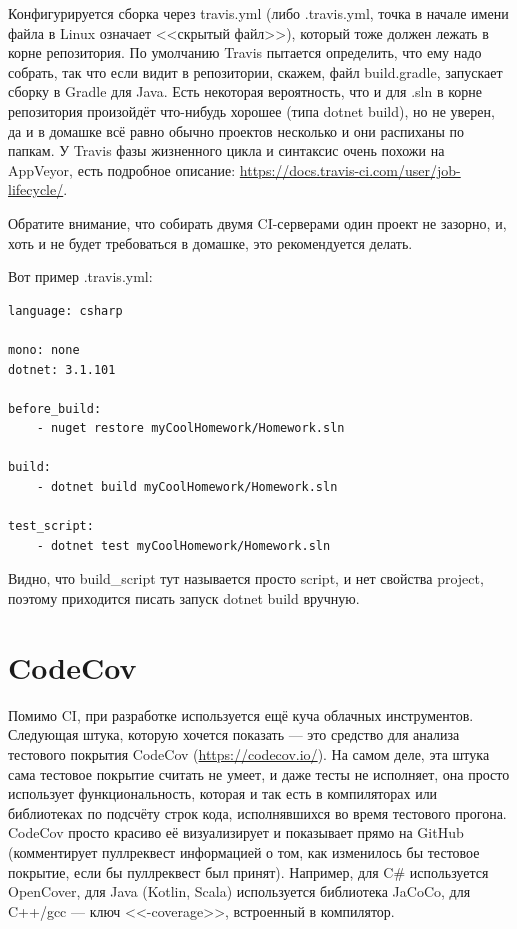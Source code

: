 \documentclass[a5paper]{article}
\begin{document}
Конфигурируется сборка через travis.yml (либо .travis.yml, точка в начале имени файла в Linux означает <<скрытый файл>>), который тоже должен лежать в корне репозитория. По умолчанию Travis пытается определить, что ему надо собрать, так что если видит в репозитории, скажем, файл build.gradle, запускает сборку в Gradle для Java. Есть некоторая вероятность, что и для .sln в корне репозитория произойдёт что-нибудь хорошее (типа dotnet build), но не уверен, да и в домашке всё равно обычно проектов несколько и они распиханы по папкам. У Travis фазы жизненного цикла и синтаксис очень похожи на AppVeyor, есть подробное описание: \url{https://docs.travis-ci.com/user/job-lifecycle/}.

Обратите внимание, что собирать двумя CI-серверами один проект не зазорно, и, хоть и не будет требоваться в домашке, это рекомендуется делать. 

Вот пример .travis.yml:

\begin{verbatim}
language: csharp

mono: none
dotnet: 3.1.101

before_build: 
    - nuget restore myCoolHomework/Homework.sln

build: 
    - dotnet build myCoolHomework/Homework.sln

test_script: 
    - dotnet test myCoolHomework/Homework.sln
\end{verbatim}

Видно, что build\_script тут называется просто script, и нет свойства project, поэтому приходится писать запуск dotnet build вручную.

\section{CodeCov}

Помимо CI, при разработке используется ещё куча облачных инструментов. Следующая штука, которую хочется показать --- это средство для анализа тестового покрытия CodeCov (\url{https://codecov.io/}). На самом деле, эта штука сама тестовое покрытие считать не умеет, и даже тесты не исполняет, она просто использует функциональность, которая и так есть в компиляторах или библиотеках по подсчёту строк кода, исполнявшихся во время тестового прогона. CodeCov просто красиво её визуализирует и показывает прямо на GitHub (комментирует пуллреквест информацией о том, как изменилось бы тестовое покрытие, если бы пуллреквест был принят). Например, для C\# используется OpenCover, для Java (Kotlin, Scala) используется библиотека JaCoCo, для C++/gcc --- ключ <<-coverage>>, встроенный в компилятор.
\end{document}
